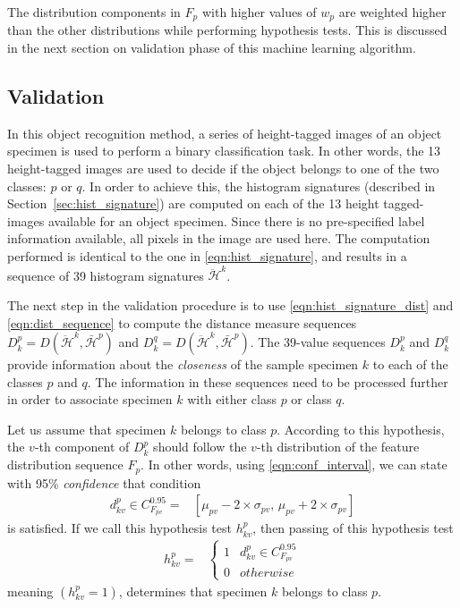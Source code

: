 The distribution components in $F_p$ with higher values of $w_p$ are weighted higher than the other distributions while performing hypothesis tests. This is discussed in the next section on validation phase of this machine learning algorithm.

\subsection{Validation}
\label{sec:distdes_validation}


In this object recognition method, a series of height-tagged images of an object specimen is used to perform a binary classification task. In other words, the 13 height-tagged images are used to decide if the object belongs to one of the two classes: $p$ or $q$. In order to achieve this, the histogram signatures (described in Section~\ref{sec:hist_signature}) are computed on each of the 13 height tagged-images available for an object specimen. Since there is no pre-specified label information available, all pixels in the image are used here. The computation performed is identical to the one in \eqref{eqn:hist_signature}, and results in a sequence of 39 histogram signatures $\ddot{\mathcal{H}}^{k}$. 

The next step in the validation procedure is to use \eqref{eqn:hist_signature_dist} and \eqref{eqn:dist_sequence} to compute the distance measure sequences $D^p_k=D(\ddot{\mathcal{H}}^{k}, \bar{\mathcal{H}}^{p})$ and $D^q_k=D(\ddot{\mathcal{H}}^{k}, \bar{\mathcal{H}}^{p})$. The 39-value sequences $D^p_k$ and $D^q_k$ provide information about the \emph{closeness} of the sample specimen $k$ to each of the classes $p$ and $q$. The information in these sequences need to be processed further in order to associate specimen $k$ with either class $p$ or class $q$.

Let us assume that specimen $k$ belongs to class $p$. According to this hypothesis, the $v$-th component of $D^p_k$ should follow the $v$-th distribution of the feature distribution sequence $F_p$. In other words, using \eqref{eqn:conf_interval}, we can state with 95\% \textit{confidence} that condition 
%
\begin{align}
  d^p_{kv} \in C^{0.95}_{F_{pv}}= &[\mu_{pv}-2 \times \sigma_{pv},\, \mu_{pv}+2 \times \sigma_{pv}]
  \label{eqn:conf_interval_validation}
\end{align}
%
is satisfied. If we call this hypothesis test $h^p_{kv}$, then passing of this hypothesis test
%
\begin{align}
 h^p_{kv} = &
 \begin{cases}
    1	&	d^p_{kv} \in C^{0.95}_{F_{pv}}\\
    0	&	otherwise
 \end{cases} \label{eqn:hypothesis_test}
\end{align}
%
meaning $(h^p_{kv}=1)$, determines that specimen $k$ belongs to class $p$.

